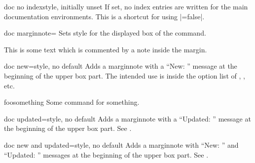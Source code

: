 \begin{docTcbKey}[][doc new={2020-04-22}]{doc no index}{}{style, initially unset}
  If set, no index entries are written for the main documentation
  environments. This is a shortcut for using |=false|.
\end{docTcbKey}

\clearpage


\begin{docTcbKey}[][doc new=2014-09-19]{doc marginnote}{=}{\tcbdocdescInitEmpty}
  Sets style  for the displayed box of the  command.
\begin{dispExample}
%
This is some text
which is commented by a note inside the margin.
\end{dispExample}
\end{docTcbKey}

\begin{docTcbKey}[][doc new=2014-09-19]{doc new}{=}{style, no default}
  Adds a marginnote with a \enquote{New: } message at the beginning of
  the upper box part. The intended use is inside the option list of
  , , etc.
  \makeatletter\renewcommand*{\tcbdocnew}[1]{\kvtcb@text@new: #1}\makeatother%
\begin{dispExample}
\begin{docCommand}[doc new=2000-01-01]{foosomething}{}
Some command for something.
\end{docCommand}
\end{dispExample}
\end{docTcbKey}


\begin{docTcbKey}[][doc new=2014-09-19]{doc updated}{=}{style, no default}
  Adds a marginnote with a \enquote{Updated: } message at the beginning of
  the upper box part. See .
\end{docTcbKey}


\begin{docTcbKey}[][doc new=2014-09-19]{doc new and updated}{=}{style, no default}
  Adds a marginnote with \enquote{New: } and \enquote{Updated: } messages at the beginning of
  the upper box part. See .
\end{docTcbKey}



